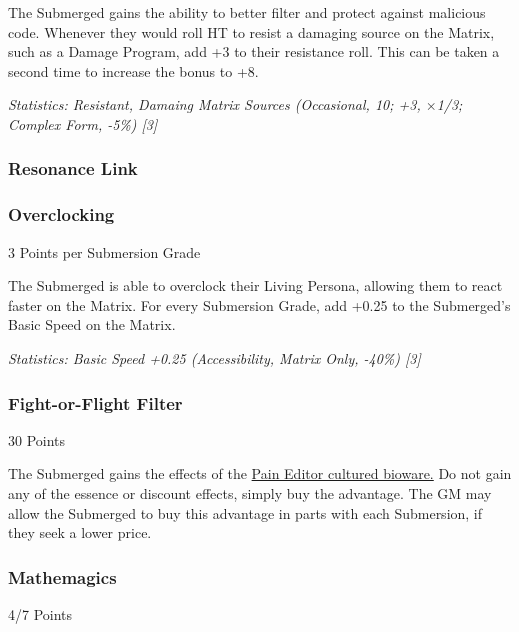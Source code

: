 \begin{multicols*}{3}
	The Submerged gains the ability to better filter and protect against malicious code. Whenever they would roll HT to resist a damaging source on the Matrix, such as a Damage Program, add +3 to their resistance roll. This can be taken a second time to increase the bonus to +8.
	
	\textit{\textcolor{OliveGreen}{Statistics: Resistant, Damaing Matrix Sources (Occasional, 10; +3, $\times$1/3; Complex Form, -5\%) [3] }}
	
	\subsubsection{Resonance Link}
	
	\subsubsection{Overclocking}
	\begin{flushright}
		3 Points per Submersion Grade
	\end{flushright}

	The Submerged is able to overclock their Living Persona, allowing them to react faster on the Matrix. For every Submersion Grade, add +0.25 to the Submerged's Basic Speed on the Matrix.	
	
	\textit{\textcolor{OliveGreen}{Statistics: Basic Speed +0.25 (Accessibility, Matrix Only, -40\%) [3] }}
	
	\subsubsection{Fight-or-Flight Filter}
	\begin{flushright}
		30 Points
	\end{flushright}
	
	The Submerged gains the effects of the \hyperref[pain_editor]{Pain Editor cultured bioware.} Do not gain any of the essence or discount effects, simply buy the advantage. The GM may allow the Submerged to buy this advantage in parts with each Submersion, if they seek a lower price.
	
	\subsubsection{Mathemagics}
	\begin{flushright}
		4/7 Points
	\end{flushright}
	

\end{multicols*}
